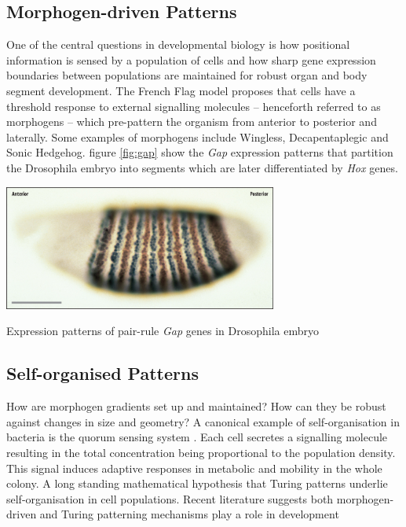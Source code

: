 \subsection{Morphogen-driven Patterns}
One of the central questions in developmental biology is how positional information is
sensed by a population of cells and how sharp gene expression boundaries between
populations are maintained for robust organ and body segment development. The
French Flag model \cite{Wolpert1969PositionalDifferentiation.} proposes that cells
have a threshold response to external signalling molecules -- henceforth referred
to as morphogens -- which pre-pattern the organism from anterior to posterior and
laterally. Some examples of morphogens include Wingless, Decapentaplegic and Sonic Hedgehog.
figure \ref{fig:gap} show the \textit{Gap} expression patterns that partition the
Drosophila embryo into segments which are later differentiated by \textit{Hox} genes.

\begin{Figure}
\includegraphics[width=90mm]{figures/gap.jpg}
\caption{Expression patterns of pair-rule \textit{Gap} genes in Drosophila embryo \cite{}}
\label{fig:gap}
\end{Figure}

\subsection{Self-organised Patterns}
How are morphogen gradients set up and maintained? How can they be robust against
changes in size and geometry? A canonical example of self-organisation in bacteria
is the quorum sensing system \cite{Miller2002QuorumBacteria}. Each cell secretes a
signalling molecule resulting in the total concentration being proportional to
the population density. This signal induces adaptive responses in metabolic and
mobility in the whole colony. A long standing mathematical hypothesis that
Turing patterns underlie self-organisation in cell populations. Recent literature
suggests both morphogen-driven and Turing patterning mechanisms play a role in development 
\cite{Green2015PositionalCombine}

